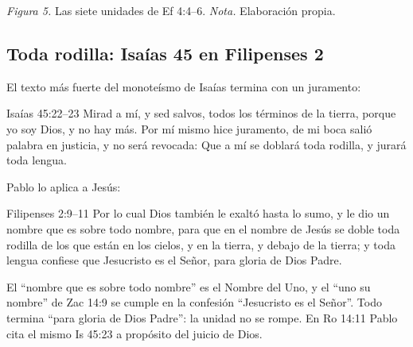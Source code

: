 \begin{center}
\par
{\footnotesize\color{gris}\textit{Figura 5.} Las siete unidades de Ef 4:4--6. \textit{Nota.} Elaboración propia.}
\end{center}

\subsection{Toda rodilla: Isaías 45 en Filipenses 2}
El texto más fuerte del monoteísmo de Isaías termina con un juramento:

\begin{verso}{Isaías 45:22–23}
Mirad a mí, y sed salvos, todos los términos de la tierra, porque yo soy Dios, y no hay más. Por mí mismo hice juramento, de mi boca salió palabra en justicia, y no será revocada: Que a mí se doblará toda rodilla, y jurará toda lengua.
\end{verso}

Pablo lo aplica a Jesús:

\begin{verso}{Filipenses 2:9–11}
Por lo cual Dios también le exaltó hasta lo sumo, y le dio un nombre que es sobre todo nombre, para que en el nombre de Jesús se doble toda rodilla de los que están en los cielos, y en la tierra, y debajo de la tierra; y toda lengua confiese que Jesucristo es el Señor, para gloria de Dios Padre.
\end{verso}

El ``nombre que es sobre todo nombre'' es el Nombre del Uno, y el ``uno su nombre'' de Zac 14:9 se cumple en la confesión ``Jesucristo es el Señor''. Todo termina ``para gloria de Dios Padre'': la unidad no se rompe. En Ro 14:11 Pablo cita el mismo Is 45:23 a propósito del juicio de Dios.


